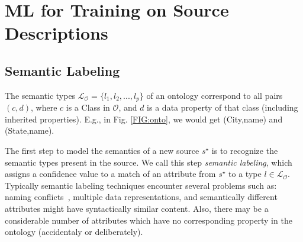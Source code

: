 \documentclass[letterpaper]{article} %
\newcommand{\authornote}[3]{
  {\fbox{\sc 
  #1}:$\blacktriangleright$\textcolor{#2}{\small{#3}}$\blacktriangleleft$}%
}
\newcommand{\ddg}[1]{\authornote{DDG}{blue}{#1}}
\begin{document}
\section{ML for Training on Source Descriptions \label{SEC:ML}}


\subsection{Semantic Labeling}
The semantic types $\mathcal{L_O} = \{l_1, l_2, ..., l_p\}$ of an ontology 
correspond to all pairs $(c,d)$, where $c$ is a Class in $\mathcal{O}$, and $d$ 
is a data property of that class (including inherited properties). 
E.g., in Fig. \ref{FIG:onto}, we would get
(City,name) and (State,name).

The first step to model the semantics of a new source $s^\star$ is to recognize the semantic types present in the source. 
We call this step \emph{semantic labeling}, which assigns a confidence value to a match of an attribute from $s^\star$ to a type $l \in 
\mathcal{L_O}$.
Typically semantic labeling techniques encounter several problems such as:
naming conflicts~\cite{Pinkel:rodi}, multiple data representations, and semantically different attributes might have syntactically similar 
content. %
Also, there may be a considerable number of attributes which have no 
corresponding property in the ontology (accidentaly or deliberately).
\end{document}
